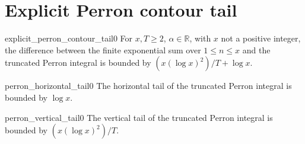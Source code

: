 \chapter{Explicit Perron contour tail}

\begin{theorem}{explicit_perron_contour_tail}{0}
For $x,T \ge 2$, $\alpha \in \mathbb{R}$, with $x$ not a positive integer, the difference
between the finite exponential sum over $1 \le n \le x$ and the truncated Perron integral
is bounded by $(x (\log x)^2)/T + \log x$.
\end{theorem}

\begin{lemma}{perron_horizontal_tail}{0}
The horizontal tail of the truncated Perron integral is bounded by $\log x$.
\end{lemma}

\begin{lemma}{perron_vertical_tail}{0}
The vertical tail of the truncated Perron integral is bounded by $(x (\log x)^2)/T$.
\end{lemma}

